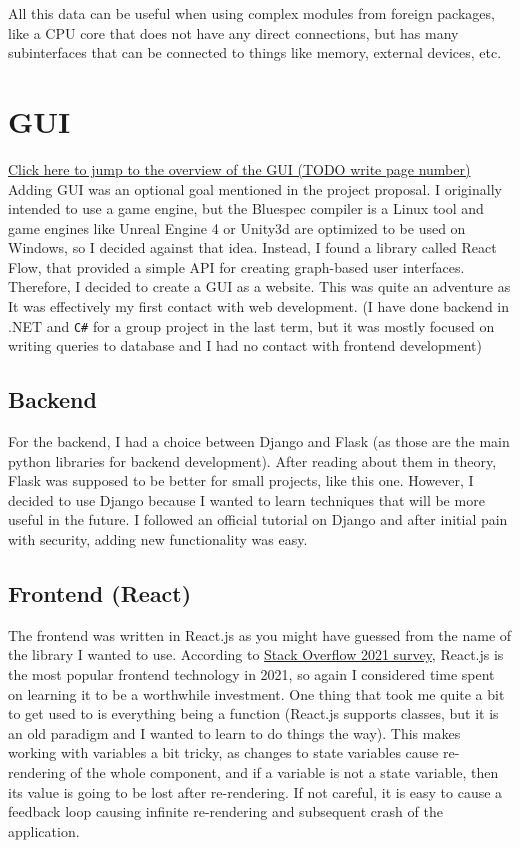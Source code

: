 \documentclass[12pt]{report}
\begin{document}
All this data can be useful when using complex modules from foreign packages, like a CPU core that does not have any direct connections, but has many subinterfaces that can be connected to things like memory, external devices, etc.

\section{GUI}
\hyperref[fig:Overview]{Click here to jump to the overview of the GUI (TODO write page number)}
\\
Adding GUI was an optional goal mentioned in the project proposal. I originally intended to use a game engine, but the Bluespec compiler is a Linux tool and game engines like Unreal Engine 4 or Unity3d are optimized to be used on Windows, so I decided against that idea. Instead, I found a library called React Flow, that provided a simple API for creating graph-based user interfaces. Therefore, I decided to create a GUI as a website. This was quite an adventure as It was effectively my first contact with web development. (I have done backend in .NET and \verb!C#! for a group project in the last term, but it was mostly focused on writing queries to database and I had no contact with frontend development)

\subsection{Backend}
For the backend, I had a choice between Django and Flask (as those are the main python libraries for backend development). After reading about them in theory, Flask was supposed to be better for small projects, like this one. However, I decided to use Django because I wanted to learn techniques that will be more useful in the future. I followed an official tutorial on Django and after initial pain with security, adding new functionality was easy.

\subsection{Frontend (React)}

The frontend was written in React.js as you might have guessed from the name of the library I wanted to use. According to \href{https://insights.stackoverflow.com/survey/2021#most-popular-technologies-webframe}{Stack Overflow 2021 survey}, React.js is the most popular frontend technology in 2021, so again I considered time spent on learning it to be a worthwhile investment. One thing that took me quite a bit to get used to is everything being a function (React.js supports classes, but it is an old paradigm and I wanted to learn to do things the  way). This makes working with variables a bit tricky, as changes to state variables cause re-rendering of the whole component, and if a variable is not a state variable, then its value is going to be lost after re-rendering. If not careful, it is easy to cause a feedback loop causing infinite re-rendering and subsequent crash of the application.
\end{document}
